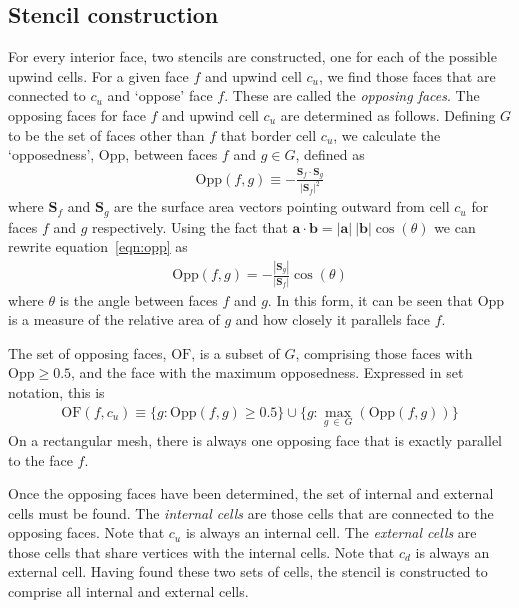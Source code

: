 \subsection{Stencil construction}
For every interior face, two stencils are constructed, one for each of the possible upwind cells.  For a given face $f$ and upwind cell $c_u$, we find those faces that are connected to $c_u$ and `oppose' face $f$.  These are called the \textit{opposing faces}.
The opposing faces for face $f$ and upwind cell $c_u$ are determined as follows.
Defining $G$ to be the set of faces other than $f$ that border cell $c_u$, we calculate the `opposedness', $\mathrm{Opp}$, between faces $f$ and $g \in G$, defined as
\begin{align}
	\mathrm{Opp}(f, g) \equiv - \frac{\mathbf{S}_f \cdot \mathbf{S}_g}{|\mathbf{S}_f|^2} \label{eqn:opp}
\end{align}
where $\mathbf{S}_f$ and $\mathbf{S}_g$ are the surface area vectors pointing outward from cell $c_u$ for faces $f$ and $g$ respectively.
Using the fact that $\mathbf{a} \cdot \mathbf{b} = |\mathbf{a}|\:|\mathbf{b}| \cos(\theta)$ we can rewrite equation~\eqref{eqn:opp} as
\begin{align}
	\mathrm{Opp}(f, g) = - \frac{|\mathbf{S}_g|}{|\mathbf{S}_f|} \cos(\theta)
\end{align}
where $\theta$ is the angle between faces $f$ and $g$.  In this form, it can be seen that $\mathrm{Opp}$ is a measure of the relative area of $g$ and how closely it parallels face $f$.

The set of opposing faces, $\mathrm{OF}$, is a subset of $G$, comprising those faces with $\mathrm{Opp} \geq 0.5$, and the face with the maximum opposedness.  Expressed in set notation, this is
\begin{align}
	\mathrm{OF}(f,c_u) \equiv \{ g : \mathrm{Opp}(f, g) \geq 0.5 \} \cup \{ g : \max_{g\:\in\:G}(\mathrm{Opp}(f, g)) \} 
\end{align}
On a rectangular mesh, there is always one opposing face that is exactly parallel to the face $f$.

Once the opposing faces have been determined, the set of internal and external cells must be found.  The \textit{internal cells} are those cells that are connected to the opposing faces.  Note that $c_u$ is always an internal cell.  The \textit{external cells} are those cells that share vertices with the internal cells.  Note that $c_d$ is always an external cell.  Having found these two sets of cells, the stencil is constructed to comprise all internal and external cells.


